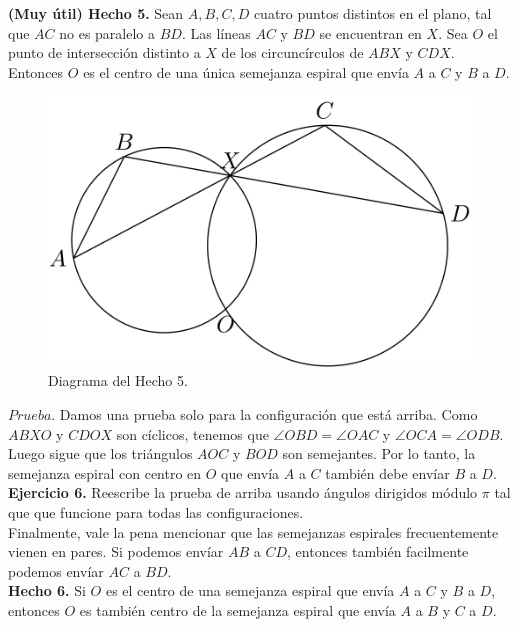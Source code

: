 \documentclass[11pt, a4paper]{article}
\begin{document}
\textbf{(Muy \'util) Hecho 5.} Sean $A, B, C, D$ cuatro puntos distintos en el plano, tal que $AC$ no es paralelo a $BD$. Las l\'ineas $AC$ y $BD$ se encuentran en $X$. Sea $O$ el punto de intersecci\'on distinto a $X$ de los circunc\'irculos de $ABX$ y $CDX$. Entonces $O$ es el centro de una \'unica semejanza espiral que env\'ia $A$ a $C$ y $B$ a $D$.
\setcounter{figure}{4}
\begin{figure}[h]
	\centering
	\includegraphics[scale=0.4]{p4.2}
	\caption{Diagrama del Hecho 5.}
\end{figure}

$Prueba.$ Damos una prueba solo para la configuraci\'on que est\'a arriba. Como $ABXO$ y $CDOX$ son c\'iclicos, tenemos que $\angle OBD = \angle OAC$ y $\angle OCA = \angle ODB$. Luego sigue que los tri\'angulos $AOC$ y $BOD$ son semejantes. Por lo tanto, la semejanza espiral con centro en $O$ que env\'ia $A$ a $C$ tambi\'en debe env\'iar $B$ a $D$.\\

\textbf{Ejercicio 6.} Reescribe la prueba de arriba usando \'angulos dirigidos m\'odulo $\pi$ tal que que funcione para todas las configuraciones. \\

Finalmente, vale la pena mencionar que las semejanzas espirales frecuentemente vienen en pares. Si podemos env\'iar $AB$ a $CD$, entonces tambi\'en facilmente podemos env\'iar $AC$ a $BD$.
\\

\textbf{Hecho 6.} Si $O$ es el centro de una semejanza espiral que env\'ia $A$ a $C$ y $B$ a $D$, entonces $O$ es tambi\'en centro de la semejanza espiral que env\'ia $A$ a $B$ y $C$ a $D$.\\
\end{document}
